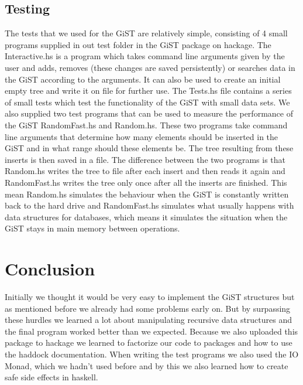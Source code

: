 \documentclass{scrartcl}
\begin{document}
\subsection{Testing}
The tests that we used for the GiST are relatively simple, consisting of 4 small programs supplied in out test folder in the GiST package on hackage. The Interactive.hs is a program which takes command line arguments
given by the user and adds, removes (these changes are saved persistently) or searches data in the GiST according to the arguments. It can also be used to create an initial empty tree and write it on file for further use.
The Tests.hs file contains a series of small tests which test the functionality of the GiST with small data sets. We also supplied two test programs that can be used to measure the performance of the GiST RandomFast.hs 
and Random.hs. These two programs take command line arguments that determine how many elements should be inserted in the GiST and in what range should these elements be. The tree resulting from these inserts is then
saved in a file. The difference between the two programs is that Random.hs writes the tree to file after each insert and then reads it again and RandomFast.hs writes the tree only once after all the inserts are finished.
This mean Random.hs simulates the behaviour when the GiST is constantly written back to the hard drive and RandomFast.hs simulates what usually happens with data structures for databases, which means it simulates the situation
when the GiST stays in main memory between operations.

\section{Conclusion}

Initially we thought it would be very easy to implement the GiST structures but as mentioned before we already had some problems early on. But by surpassing 
these hurdles we learned a lot about manipulating recursive data structures and the final program worked better than we expected. Because we also uploaded
this package to hackage we learned to factorize our code to packages and how to use the haddock documentation. When writing the test programs we also used the IO Monad,
which we hadn't used before and by this we also learned how to create safe side effects in haskell. 

 

\end{document}
